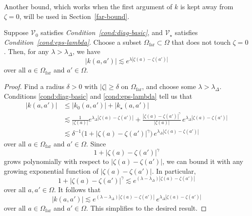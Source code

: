 \documentclass[review]{siamart220329}
\newcommand{\hardpart}{\mathcal{V}_0}
\newcommand{\softpart}{\mathcal{V}_\star}
\newcommand{\kerwhole}{k}
\newcommand{\hardker}{k_0}
\newcommand{\softker}{k_\star}
\newcommand{\domain}{\Omega}
\newcommand{\far}{\Omega_\text{far}}
\begin{document}
Another bound, which works when the first argument of $\kerwhole$ is kept away from $\zeta = 0$, will be used in Section~\ref{far-bound}.
\begin{proposition}\label{prop:whole-ker-far-bound}
Suppose $\hardpart$ satisfies {\em Condition~\eqref{cond:diag-basic}}, and $\softpart$ satisfies {\em Condition~\eqref{cond:eps-lambda}}. Choose a subset $\far \subset \domain$ that does not touch $\zeta = 0$. Then, for any $\lambda > \lambda_\Delta$, we have
\[ |\kerwhole(a,a')| \lesssim e^{\lambda |\zeta(a)-\zeta(a')|} \]
over all $a \in \far$ and $a' \in \domain$.
\end{proposition}
\begin{proof}
Find a radius $\delta > 0$ with $|\zeta| \ge \delta$ on $\far$, and choose some $\lambda > \lambda_\Delta$. Conditions \eqref{cond:diag-basic} and \eqref{cond:eps-lambda} tell us that
\begin{align*}
|\kerwhole(a,a')|&\leq |\hardker(a,a')| + |\softker(a,a')|\\
&\lesssim \frac{1}{|\zeta(a)|} e^{\lambda_\Delta |\zeta(a)-\zeta(a')|} + \frac{|\zeta(a)-\zeta(a')|^\gamma}{|\zeta(a)|}\,e^{\lambda_\Delta|\zeta(a)-\zeta(a')|}\\
&\lesssim \delta^{-1} \big(1 + |\zeta(a)-\zeta(a')|^\gamma \big) \, e^{\lambda_\Delta|\zeta(a)-\zeta(a')|}
\end{align*}
over all $a \in \far$ and $a' \in \domain$. Since
\[ 1 + |\zeta(a)-\zeta(a')|^\gamma \]
grows polynomially with respect to $|\zeta(a)-\zeta(a')|$, we can bound it with any growing exponential function of $|\zeta(a)-\zeta(a')|$. In particular,
\[ 1 + |\zeta(a)-\zeta(a')|^\gamma \lesssim e^{(\lambda - \lambda_\Delta) |\zeta(a)-\zeta(a')|} \]
over all $a, a' \in \domain$. It follows that
\[ |\kerwhole(a,a')| \lesssim e^{(\lambda - \lambda_\Delta) |\zeta(a)-\zeta(a')|} \, e^{\lambda_\Delta|\zeta(a)-\zeta(a')|} \]
over all $a \in \far$ and $a' \in \domain$. This simplifies to the desired result.
\end{proof}
\end{document}

